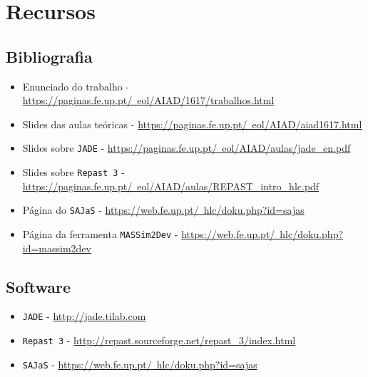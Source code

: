 \documentclass[12pt]{report}
\begin{document}
\chapter{Recursos}

\section{Bibliografia}

\begin{itemize}
	\item Enunciado do trabalho - \href{https://paginas.fe.up.pt/~eol/AIAD/1617/trabalhos.html#T05}{https://paginas.fe.up.pt/~eol/AIAD/1617/trabalhos.html}
	\item Slides das aulas teóricas - \href{https://paginas.fe.up.pt/~eol/AIAD/aiad1617.html}{https://paginas.fe.up.pt/~eol/AIAD/aiad1617.html}
	\item Slides sobre \texttt{JADE} - \href{https://paginas.fe.up.pt/~eol/AIAD/aulas/jade_en.pdf}{https://paginas.fe.up.pt/~eol/AIAD/aulas/jade\_en.pdf}
	\item Slides sobre \texttt{Repast 3} - \href{https://paginas.fe.up.pt/~eol/AIAD/aulas/REPAST_intro_hlc.pdf}{https://paginas.fe.up.pt/~eol/AIAD/aulas/REPAST\_intro\_hlc.pdf}
	\item Página do \texttt{SAJaS} - \href{https://web.fe.up.pt/~hlc/doku.php?id=sajas}{https://web.fe.up.pt/~hlc/doku.php?id=sajas}
	\item Página da ferramenta \texttt{MASSim2Dev} - \href{https://web.fe.up.pt/~hlc/doku.php?id=massim2dev}{https://web.fe.up.pt/~hlc/doku.php?id=massim2dev}
\end{itemize}

\section{Software}

\begin{itemize}
	\item \texttt{JADE} - \href{http://jade.tilab.com}{http://jade.tilab.com}
	\item \texttt{Repast 3} - \href{http://repast.sourceforge.net/repast_3/index.html}{http://repast.sourceforge.net/repast\_3/index.html}
	\item \texttt{SAJaS} - \href{https://web.fe.up.pt/~hlc/doku.php?id=sajas}{https://web.fe.up.pt/~hlc/doku.php?id=sajas}
\end{itemize}
\end{document}
